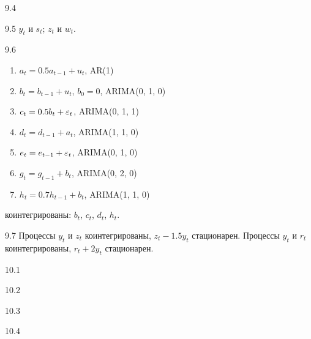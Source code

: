 \protect \hypertarget {soln:9.4}{}
\begin{solution}{{9.4}}

\end{solution}
\protect \hypertarget {soln:9.5}{}
\begin{solution}{{9.5}}
$y_t$ и $s_t$; $z_t$ и $w_t$.
\end{solution}
\protect \hypertarget {soln:9.6}{}
\begin{solution}{{9.6}}
  \begin{enumerate}
    \item $a_t = 0.5 a_{t-1} + u_t$, AR(1)
    \item $b_t = b_{t-1} + u_t$, $b_0 = 0$, ARIMA(0, 1, 0)
    \item $c_t = 0.5 b_t + \varepsilon_t$, ARIMA(0, 1, 1)
    \item $d_t = d_{t-1} + a_t$, ARIMA(1, 1, 0)
    \item $e_t = e_{t-1} + \varepsilon_t$, ARIMA(0, 1, 0)
    \item $g_t = g_{t-1} + b_t$, ARIMA(0, 2, 0)
    \item $h_t = 0.7 h_{t-1} + b_t$, ARIMA(1, 1, 0)
  \end{enumerate}
  коинтегрированы: $b_t$, $c_t$, $d_t$, $h_t$.
\end{solution}
\protect \hypertarget {soln:9.7}{}
\begin{solution}{{9.7}}
Процессы $y_t$ и $z_t$ коинтегрированы, $z_t - 1.5y_t$ стационарен.
Процессы $y_t$ и $r_t$ коинтегрированы, $r_t + 2y_t$ стационарен.
\end{solution}
\protect \hypertarget {soln:10.1}{}
\begin{solution}{{10.1}}
\end{solution}
\protect \hypertarget {soln:10.2}{}
\begin{solution}{{10.2}}
\end{solution}
\protect \hypertarget {soln:10.3}{}
\begin{solution}{{10.3}}
\end{solution}
\protect \hypertarget {soln:10.4}{}
\begin{solution}{{10.4}}
\end{solution}
